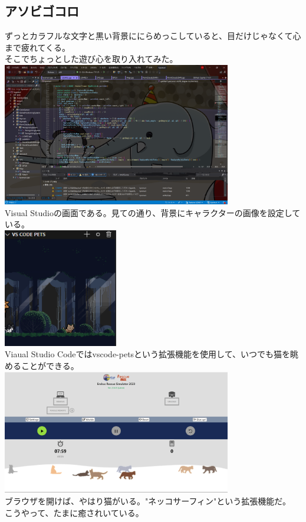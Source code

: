 \documentclass[dvipdfmx,a4paper]{jsarticle}
\begin{document}
    \subsection{アソビゴコロ}
    ずっとカラフルな文字と黒い背景ににらめっこしていると、目だけじゃなくて心まで疲れてくる。\\
    そこでちょっとした遊び心を取り入れてみた。\\
    \includegraphics[width=100mm]{Photo/photo0.png}\\
    Visual Studioの画面である。見ての通り、背景にキャラクターの画像を設定している。\\

    \includegraphics[width=50mm]{Photo/photo2.png}\\
    Viaual Studio Codeではvscode-petsという拡張機能を使用して、いつでも猫を眺めることができる。\\

    \includegraphics[width=100mm]{Photo/photo3.png}\\
    ブラウザを開けば、やはり猫がいる。"ネッコサーフィン"という拡張機能だ。\\

    こうやって、たまに癒されいている。\\
\end{document}
